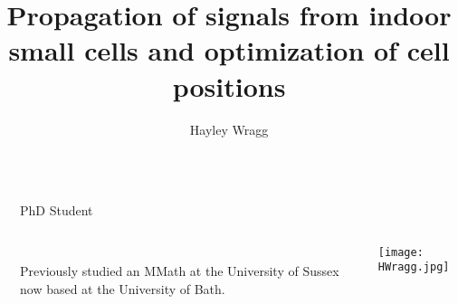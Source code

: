\documentclass[final]{beamer}
\title{Propagation of signals from \vspace{0.5cm} indoor small cells and \vspace{0.5cm} optimization of cell positions} %
\author{Hayley Wragg} %
\institute{University of Bath} %
\theoremstyle{plain}
\theoremstyle{definition}
\theoremstyle{remark}
\newlength{\sepwid}
\newlength{\onecolwid}
\begin{document}

\setlength{\belowcaptionskip}{2ex} %
\setlength{\belowdisplayshortskip}{2ex} %

\begin{frame}[t] %

\begin{columns}[t] %

\begin{column}{\sepwid}\end{column} %

\begin{column}{\onecolwid} %


  
    \begin{mdframed}[backgroundcolor=white, userdefinedwidth=0.999999\linewidth]
    \centering
    \center
  
    \end{mdframed}
    \vspace{1.5cm}
    
\begin{alertblock}{PhD Student}
\begin{columns} \begin{column}{0.75\linewidth}
\textbf{\insertauthor} \hspace{1cm}
 \\
Previously studied an MMath at the University of Sussex now based at the University of Bath.
\end{column}
\begin{column}{0.25\linewidth}
\texttt{[image: HWragg.jpg]}
\end{column}
\end{columns}
\end{alertblock}


\end{column}
\end{columns}
\end{frame}
\end{document}
